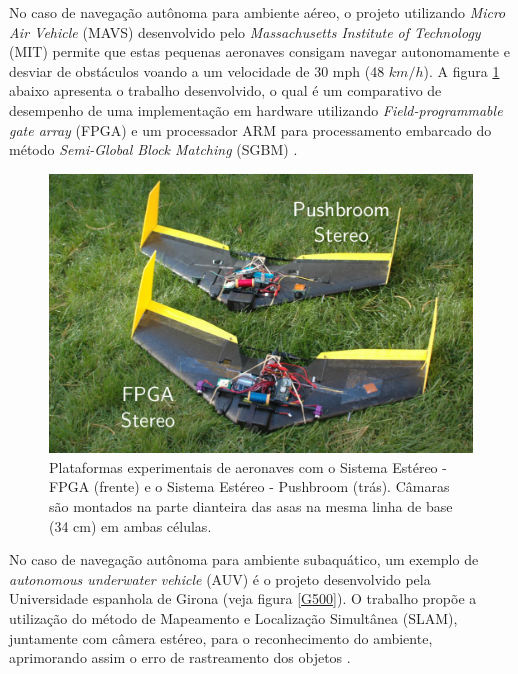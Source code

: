 No caso de navegação autônoma para ambiente aéreo, o projeto utilizando \textit{Micro Air Vehicle} (MAVS) desenvolvido pelo \textit{Massachusetts Institute of Technology} (MIT) permite que estas pequenas aeronaves consigam navegar autonomamente e desviar de obstáculos voando a um velocidade de 30 mph (48 $km/h$). A figura \ref{mit_drones} abaixo apresenta o trabalho desenvolvido, o qual é um comparativo de desempenho de uma implementação em hardware utilizando \textit{Field-programmable gate array} (FPGA) e um processador ARM para processamento embarcado do método \textit{Semi-Global Block Matching} (SGBM) \cite{BarryMIT}.

\begin{figure}[H]
 	\centering
 	\includegraphics[scale=0.30]{./Resources/mit_drones.png}
 	\caption{Plataformas experimentais de aeronaves com o Sistema Estéreo - FPGA (frente) e o Sistema Estéreo - Pushbroom (trás). Câmaras são montados na parte dianteira das asas na mesma linha de base (34 cm) em ambas células.}
 	\label{mit_drones}
\end{figure}

No caso de navegação autônoma para ambiente subaquático, um exemplo de \textit{autonomous underwater vehicle} (AUV) é o projeto desenvolvido pela Universidade espanhola de Girona (veja figura \ref{G500}). O trabalho propõe a utilização do método de Mapeamento e Localização Simultânea (SLAM), juntamente com câmera estéreo, para o reconhecimento do ambiente, aprimorando assim o erro de rastreamento dos objetos \cite{Nagappa2013}.

